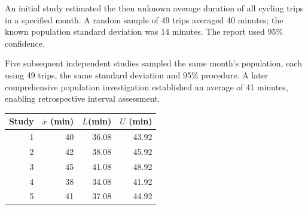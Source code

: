\noindent\begin{minipage}[t]{0.68\linewidth}
\vspace{0pt}
An initial study estimated the then unknown average duration of all cycling trips in a specified month. A random sample of 49 trips averaged 40 minutes; the known population standard deviation was 14 minutes. The report used 95\% confidence.

Five subsequent independent studies sampled the same month's population, each using 49 trips, the same standard deviation and 95\% procedure. A later comprehensive population investigation established an average of 41 minutes, enabling retrospective interval assessment.
\end{minipage}\hfill
\begin{minipage}[t]{0.30\linewidth}
\vspace{0pt}
\centering
\begin{tabular}{@{}rrrr@{}}\toprule
Study&$\bar{x}$ (min)& $L$(min)&$U$ (min)\\\midrule
1&40&36.08&43.92\\
2&42&38.08&45.92\\
3&45&41.08&48.92\\
4&38&34.08&41.92\\
5&41&37.08&44.92\\\bottomrule
\end{tabular}
\end{minipage}\par

\vspace{-3mm}
